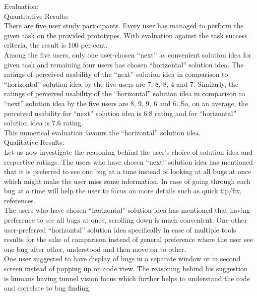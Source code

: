 Evaluation: \\

Quantitative Results: \\

There are five user study participants. Every user has managed to perform the given task on the provided prototypes. With evaluation against the task success criteria, the result is 100 per cent. \\

Among the five users, only one user-chosen “next” as convenient solution idea for given task and remaining four users has chosen “horizontal” solution idea. The ratings of perceived usability of the “next” solution idea in comparison to “horizontal” solution idea by the five users are 7, 8, 8, 4 and 7. Similarly, the ratings of perceived usability of the “horizontal” solution idea in comparison to “next” solution idea by the five users are 8, 9, 9, 6 and 6. So, on an average, the perceived usability for “next” solution idea is 6.8 rating and for “horizontal” solution idea is 7.6 rating. \\

This numerical evaluation favours the “horizontal” solution idea. \\

Qualitative Results: \\

Let us now investigate the reasoning behind the user’s choice of solution idea and respective ratings. The users who have chosen “next” solution idea has mentioned that it is preferred to see one bug at a time instead of looking at all bugs at once which might make the user miss some information. In case of going through each bug at a time will help the user to focus on more details such as quick tip/fix, references. \\

The users who have chosen “horizontal” solution idea has mentioned that having preference to see all bugs at once, scrolling down is much convenient. One other user-preferred “horizontal” solution idea specifically in case of multiple tools results for the sake of comparison instead of general preference where the user see one bug after other, understood and then move on to other. \\

One user suggested to have display of bugs in a separate window or in second screen instead of popping up on code view. The reasoning behind his suggestion is humans having tunnel vision focus which further helps to understand the code and correlate to bug finding. \\


